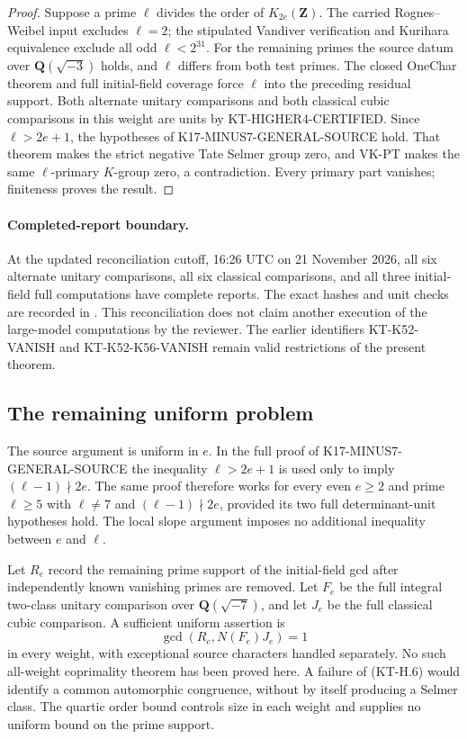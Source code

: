 \begin{proof}
Suppose a prime $\ell$ divides the order of $K_{2e}(\mathbf Z)$.
The carried Rognes--Weibel input excludes $\ell=2$; the
stipulated Vandiver verification and Kurihara equivalence
exclude all odd $\ell<2^{31}$.  For the remaining primes the
source datum over $\mathbf Q(\sqrt{-3})$ holds, and $\ell$ differs
from both test primes.  The closed OneChar theorem and full
initial-field coverage force $\ell$ into the preceding residual
support.  Both alternate unitary comparisons and both classical
cubic comparisons in this weight are units by
KT-HIGHER4-CERTIFIED.  Since $\ell>2e+1$, the hypotheses of
K17-MINUS7-GENERAL-SOURCE hold.  That theorem makes the strict
negative Tate Selmer group zero, and VK-PT makes the same
$\ell$-primary $K$-group zero, a contradiction.  Every primary
part vanishes; finiteness proves the result.
\end{proof}

\paragraph{Completed-report boundary.}
At the updated reconciliation cutoff, 16:26 UTC on
21 November 2026, all six alternate unitary comparisons,
all six classical comparisons, and all three initial-field
full computations have complete reports.  The exact hashes
and unit checks are recorded in
.  This reconciliation
does not claim another execution of the large-model computations
by the reviewer.  The earlier identifiers KT-K52-VANISH and
KT-K52-K56-VANISH remain valid restrictions of the present theorem.

\subsection{The remaining uniform problem}

The source argument is uniform in $e$.  In the full proof of
K17-MINUS7-GENERAL-SOURCE the inequality $\ell>2e+1$ is used
only to imply $(\ell-1)\nmid2e$.  The same proof therefore works
for every even $e\ge2$ and prime $\ell\ge5$ with $\ell\ne7$
and $(\ell-1)\nmid2e$, provided its two full determinant-unit
hypotheses hold.  The local slope argument imposes no additional
inequality between $e$ and $\ell$.

Let $R_e$ record the remaining prime support of the initial-field
gcd after independently known vanishing primes are removed.
Let $F_e$ be the full integral two-class unitary comparison over
$\mathbf Q(\sqrt{-7})$, and let $J_e$ be the full classical cubic
comparison.  A sufficient uniform assertion is
\[
               \gcd(R_e,N(F_e)J_e)=1               \tag{KT-H.6}
\]
in every weight, with exceptional source characters handled
separately.  No such all-weight coprimality theorem has been
proved here.  A failure of (KT-H.6) would identify a common
automorphic congruence, without by itself producing a Selmer
class.  The quartic order bound controls size in each weight
and supplies no uniform bound on the prime support.

